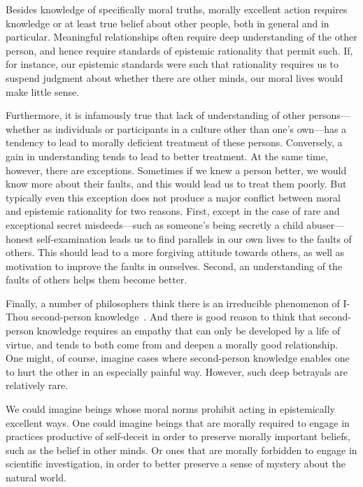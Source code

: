 Besides knowledge of specifically moral truths, morally excellent action requires knowledge or at least true belief about 
other people, both in general and in particular. Meaningful relationships often require deep understanding of the other 
person, and hence require standards of epistemic rationality that permit such. If, for instance, our epistemic standards
were such that rationality requires us to suspend judgment about whether there are other minds, our moral lives would 
make little sense. 

Furthermore, it is infamously true that lack of understanding of other persons---whether as individuals or participants in 
a culture other than one's own---has a tendency to lead to morally deficient treatment of these persons. Conversely, a 
gain in understanding tends to lead to better treatment. At the same time, however, there are exceptions. Sometimes if we 
knew a person better, we would know more about their faults, and this would lead us to treat them poorly. But typically 
even this exception does not produce a major conflict between moral and epistemic rationality for two reasons. First, 
except in the case of rare and exceptional secret misdeeds---such as someone's being secretly a child 
abuser---honest self-examination leads us to find parallels in 
our own lives to the faults of others. This should lead to a more forgiving attitude towards others, as well as motivation
to improve the faults in ourselves. Second, an understanding of the faults of others helps them 
become better.

Finally, a number of philosophers think there is an irreducible phenomenon of I-Thou second-person knowledge~\parencite{Stump2010,Benton2017}. And there is good
reason to think that second-person knowledge requires an empathy that can only be developed by a life of virtue, and 
tends to both come from and deepen a morally good relationship. One might, of course, imagine cases where second-person 
knowledge enables one to hurt the other in an especially painful way. However, such deep betrayals are relatively rare.

We could imagine beings whose moral norms prohibit acting in epistemically excellent ways. One could imagine
beings that are morally required to engage in practices productive of self-deceit in order to preserve morally important
beliefs, such as the belief in other minds. Or ones that are morally forbidden to engage in scientific investigation,
in order to better preserve a sense of mystery about the natural world.

